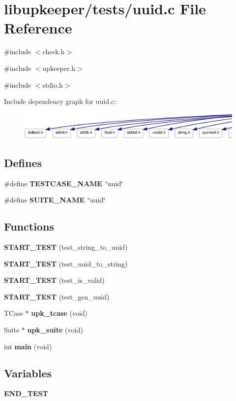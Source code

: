\section{libupkeeper/tests/uuid.c File Reference}
\label{tests_2uuid_8c}
{\ttfamily \#include $<$check.h$>$}\par
{\ttfamily \#include $<$upkeeper.h$>$}\par
{\ttfamily \#include $<$stdio.h$>$}\par
Include dependency graph for uuid.c:
\nopagebreak
\begin{figure}[H]
\begin{center}
\leavevmode
\includegraphics[width=400pt]{tests_2uuid_8c__incl}
\end{center}
\end{figure}
\subsection*{Defines}
\begin{DoxyCompactItemize}
\item 
\#define {\bf TESTCASE\_\-NAME}~\char`\"{}uuid\char`\"{}
\item 
\#define {\bf SUITE\_\-NAME}~\char`\"{}uuid\char`\"{}
\end{DoxyCompactItemize}
\subsection*{Functions}
\begin{DoxyCompactItemize}
\item 
{\bf START\_\-TEST} (test\_\-string\_\-to\_\-uuid)
\item 
{\bf START\_\-TEST} (test\_\-uuid\_\-to\_\-string)
\item 
{\bf START\_\-TEST} (test\_\-is\_\-valid)
\item 
{\bf START\_\-TEST} (test\_\-gen\_\-uuid)
\item 
TCase $\ast$ {\bf upk\_\-tcase} (void)
\item 
Suite $\ast$ {\bf upk\_\-suite} (void)
\item 
int {\bf main} (void)
\end{DoxyCompactItemize}
\subsection*{Variables}
\begin{DoxyCompactItemize}
\item 
{\bf END\_\-TEST}
\end{DoxyCompactItemize}


